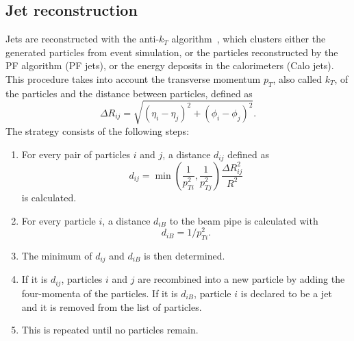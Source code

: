 % 
% 
\subsection{Jet reconstruction}
\label{sec:jet_reconstruction}

% 

Jets are reconstructed with the anti-$k_T$ algorithm~\cite{1126-6708-2008-04-063}, which clusters either the generated particles from event simulation, or the particles reconstructed by the \ac{PF} algorithm (\ac{PF} jets), or the energy deposits in the calorimeters (Calo jets). This procedure takes into account the transverse momentum $p_T$, also called $k_T$, of the particles and the distance between particles, defined as \begin{equation}                                                                                                                                                                                                                                                                                                     
 \Delta R_{ij} = \sqrt{(\eta_i - \eta_j)^2 + (\phi_i - \phi_j)^2}.                                                                                                                                                                                                                                                                                        \end{equation}
The strategy consists of the following steps:
\begin{enumerate}
 \item For every pair of particles $i$ and $j$, a distance $d_{ij}$ defined as 
 \begin{equation}
  d_{ij} = \min\left(\frac{1}{p_{Ti}^2}, \frac{1}{p_{Tj}^2} \right)\frac{\Delta R_{ij}^2}{R^2}
 \end{equation}
 is calculated.
 \item For every particle $i$, a distance $d_{iB}$ to the beam pipe is calculated with
 \begin{equation}
  d_{iB} = 1/p_{Ti}^{2}.
 \end{equation}
 \item The minimum of $d_{ij}$ and $d_{iB}$ is then determined.
 \item If it is $d_{ij}$, particles $i$ and $j$ are recombined into a new particle by adding the four-momenta of the particles. If it is $d_{iB}$, particle $i$ is declared to be a jet and it is removed from the list of particles.
 \item This is repeated until no particles remain.
\end{enumerate}

